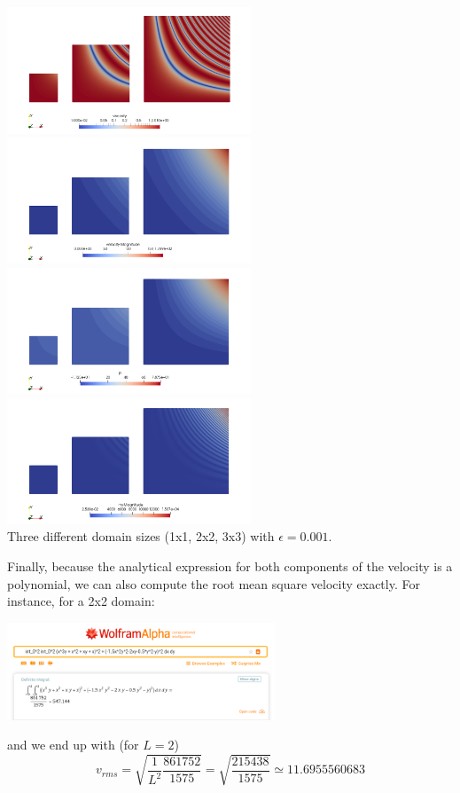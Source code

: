 \begin{center}
\includegraphics[width=7.28cm]{images/mms/mms7_visc}
\includegraphics[width=7.28cm]{images/mms/mms7_vel}\\
\includegraphics[width=7.28cm]{images/mms/mms7_press}
\includegraphics[width=7.28cm]{images/mms/mms7_rhs}\\
Three different domain sizes (1x1, 2x2, 3x3) with $\epsilon=0.001$.
\end{center}


Finally, because the analytical expression for both components of the velocity is a polynomial, we can also
compute the root mean square velocity exactly. For instance, for a 2x2 domain:
\begin{center}
\includegraphics[width=8cm]{images/mms/mms7_vrmstheo}
\end{center}
and we end up with (for $L=2$)
\[
v_{rms} = \sqrt{\frac{1}{L^2}\frac{861752}{1575}} = \sqrt{\frac{215438}{1575}}
\simeq 11.6955560683
\]


